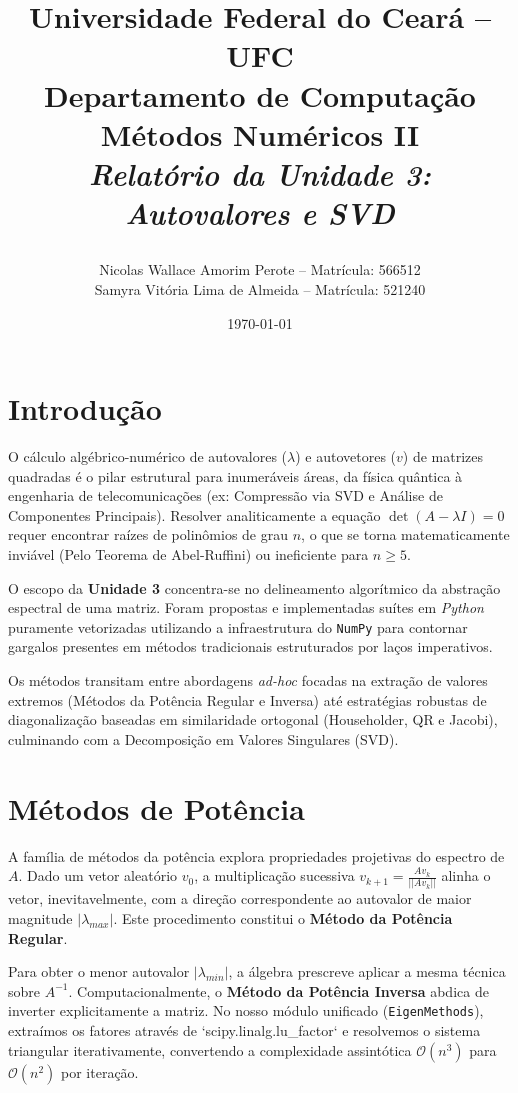 \documentclass[12pt,a4paper]{article}
\title{
    \vspace{-1cm}
    \begin{center}
        \Large \textbf{Universidade Federal do Ceará -- UFC} \\
        \large Departamento de Computação \\
        \vspace{1cm}
        \Huge \textbf{Métodos Numéricos II} \\
        \vspace{0.5cm}
        \Large \textit{Relatório da Unidade 3: Autovalores e SVD}
    \end{center}
}
\author{
    Nicolas Wallace Amorim Perote -- Matrícula: 566512 \\
    Samyra Vitória Lima de Almeida -- Matrícula: 521240
}
\date{\today}
\begin{document}
\maketitle
\tableofcontents
\newpage

\section{Introdução}
O cálculo algébrico-numérico de autovalores ($\lambda$) e autovetores ($v$) de matrizes quadradas é o pilar estrutural para inumeráveis áreas, da física quântica à engenharia de telecomunicações (ex: Compressão via SVD e Análise de Componentes Principais). Resolver analiticamente a equação $\det(A - \lambda I) = 0$ requer encontrar raízes de polinômios de grau $n$, o que se torna matematicamente inviável (Pelo Teorema de Abel-Ruffini) ou ineficiente para $n \geq 5$.

O escopo da \textbf{Unidade 3} concentra-se no delineamento algorítmico da abstração espectral de uma matriz. Foram propostas e implementadas suítes em \textit{Python} puramente vetorizadas utilizando a infraestrutura do \texttt{NumPy} para contornar gargalos presentes em métodos tradicionais estruturados por laços imperativos.

Os métodos transitam entre abordagens \textit{ad-hoc} focadas na extração de valores extremos (Métodos da Potência Regular e Inversa) até estratégias robustas de diagonalização baseadas em similaridade ortogonal (Householder, QR e Jacobi), culminando com a Decomposição em Valores Singulares (SVD).

\section{Métodos de Potência}
A família de métodos da potência explora propriedades projetivas do espectro de $A$.
Dado um vetor aleatório $v_0$, a multiplicação sucessiva $v_{k+1} = \frac{A v_k}{||A v_k||}$ alinha o vetor, inevitavelmente, com a direção correspondente ao autovalor de maior magnitude $|\lambda_{max}|$. Este procedimento constitui o \textbf{Método da Potência Regular}.

Para obter o menor autovalor $|\lambda_{min}|$, a álgebra prescreve aplicar a mesma técnica sobre $A^{-1}$. Computacionalmente, o \textbf{Método da Potência Inversa} abdica de inverter explicitamente a matriz. No nosso módulo unificado (\texttt{EigenMethods}), extraímos os fatores através de `scipy.linalg.lu\_factor` e resolvemos o sistema triangular iterativamente, convertendo a complexidade assintótica $\mathcal{O}(n^3)$ para $\mathcal{O}(n^2)$ por iteração.
\end{document}
